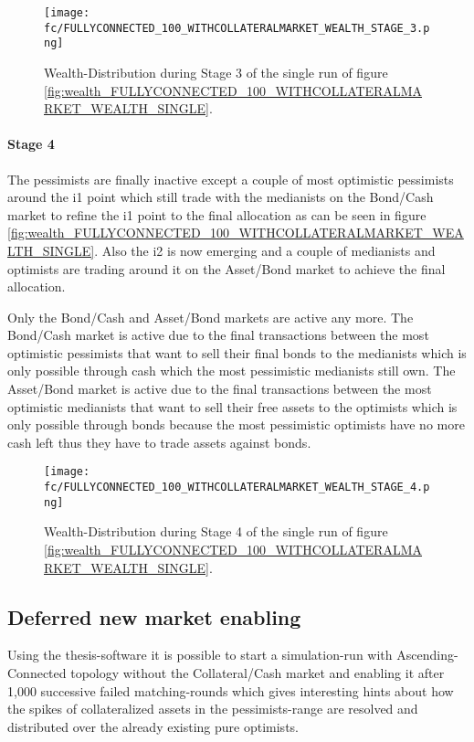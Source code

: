 \documentclass[Bachelorarbeit.tex]{subfiles}
\begin{document}
\begin{figure}[H]
	\centering
  \texttt{[image: fc/FULLYCONNECTED\_100\_WITHCOLLATERALMARKET\_WEALTH\_STAGE\_3.png]}
  	\caption{Wealth-Distribution during Stage 3 of the single run of figure \ref{fig:wealth_FULLYCONNECTED_100_WITHCOLLATERALMARKET_WEALTH_SINGLE}.}
	\label{fig:markets_FULLYCONNECTED_100_WITHCOLLATERALMARKET_WEALTH_STAGE_3}
\end{figure}

\paragraph{Stage 4}
The pessimists are finally inactive except a couple of most optimistic pessimists around the i1 point which still trade with the medianists on the Bond/Cash market to refine the i1 point to the final allocation as can be seen in figure \ref{fig:wealth_FULLYCONNECTED_100_WITHCOLLATERALMARKET_WEALTH_SINGLE}. Also the i2 is now emerging and a couple of medianists and optimists are trading around it on the Asset/Bond market to achieve the final allocation.

\medskip

Only the Bond/Cash and Asset/Bond markets are active any more. The Bond/Cash market is active due to the final transactions between the most optimistic pessimists that want to sell their final bonds to the medianists which is only possible through cash which the most pessimistic medianists still own. The Asset/Bond market is active due to the final transactions between the most optimistic medianists that want to sell their free assets to the optimists which is only possible through bonds because the most pessimistic optimists have no more cash left thus they have to trade assets against bonds.

\begin{figure}[H]
	\centering
  \texttt{[image: fc/FULLYCONNECTED\_100\_WITHCOLLATERALMARKET\_WEALTH\_STAGE\_4.png]}
  	\caption{Wealth-Distribution during Stage 4 of the single run of figure \ref{fig:wealth_FULLYCONNECTED_100_WITHCOLLATERALMARKET_WEALTH_SINGLE}.}
	\label{fig:markets_FULLYCONNECTED_100_WITHCOLLATERALMARKET_WEALTH_STAGE_4}
\end{figure}

\subsection{Deferred new market enabling}
Using the thesis-software it is possible to start a simulation-run with Ascending-Connected topology without the Collateral/Cash market and enabling it after 1,000 successive failed matching-rounds which gives interesting hints about how the spikes of collateralized assets in the pessimists-range are resolved and distributed over the already existing pure optimists.
\end{document}
